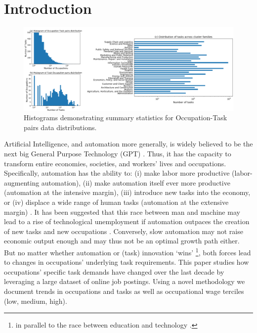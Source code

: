 \documentclass[letterpaper]{article} %
\begin{document}
\section{Introduction}
\label{sec:intro}
%
%
\begin{figure}[h!]
    \centering
    \includegraphics[width=0.85\linewidth]{combined_stats.png}
    \caption{Histograms demonstrating summary statistics for Occupation-Task pairs data distributions.}
    \label{fig:Skill2SOC}
\end{figure}
%
%
Artificial Intelligence, and automation more generally, is widely believed to be the next big General Purpose Technology (GPT) \cite{Brynjolfsson2018b}. Thus, it has the capacity to transform entire economies, societies, and workers' lives and occupations. Specifically, automation has the ability to: (i) make labor more productive (labor-augmenting automation), (ii) make automation itself ever more productive (automation at the intensive margin), (iii) introduce new tasks into the economy, or (iv) displace a wide range of human tasks (automation at the extensive margin) \cite{Acemoglu2019}. It has been suggested that this race between man and machine may lead to a rise of technological unemployment if automation outpaces the creation of new tasks and new occupations \cite{Acemoglu2018c}. Conversely, slow automation may not raise economic output enough and may thus not be an optimal growth path either. But no matter whether automation or (task) innovation `wins' \footnote{in parallel to the race between education and technology \cite{Goldin2007}.}, both forces lead to changes in occupations' underlying task requirements. This paper studies how occupations' specific task demands have changed over the last decade by leveraging a large dataset of online job postings. Using a novel methodology we document trends in occupations and tasks as well as occupational wage terciles (low, medium, high). 
\par
\end{document}

